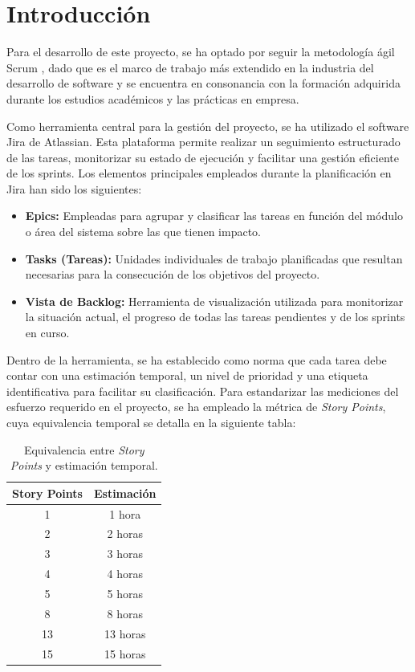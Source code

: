 
\section{Introducción}
Para el desarrollo de este proyecto, se ha optado por seguir la metodología ágil Scrum \cite{schwaber2020scrumguide}, dado que es el marco de trabajo más extendido en la industria del desarrollo de software y se encuentra en consonancia con la formación adquirida durante los estudios académicos y las prácticas en empresa.

Como herramienta central para la gestión del proyecto, se ha utilizado el software Jira de Atlassian. Esta plataforma permite realizar un seguimiento estructurado de las tareas, monitorizar su estado de ejecución y facilitar una gestión eficiente de los sprints. Los elementos principales empleados durante la planificación en Jira han sido los siguientes:
\begin{itemize}
    \item \textbf{Epics:} Empleadas para agrupar y clasificar las tareas en función del módulo o área del sistema sobre las que tienen impacto.
    \item \textbf{Tasks (Tareas):} Unidades individuales de trabajo planificadas que resultan necesarias para la consecución de los objetivos del proyecto.
    \item \textbf{Vista de Backlog:} Herramienta de visualización utilizada para monitorizar la situación actual, el progreso de todas las tareas pendientes y de los sprints en curso.
\end{itemize}

Dentro de la herramienta, se ha establecido como norma que cada tarea debe contar con una estimación temporal, un nivel de prioridad y una etiqueta identificativa para facilitar su clasificación. Para estandarizar las mediciones del esfuerzo requerido en el proyecto, se ha empleado la métrica de \textit{Story Points}, cuya equivalencia temporal se detalla en la siguiente tabla:

\begin{table}[H]
    \centering
    \begin{tabular}{| c | c |}
        \hline
        \textbf{Story Points} & \textbf{Estimación} \\ \hline
        1 & 1 hora \\ \hline
        2 & 2 horas \\ \hline
        3 & 3 horas \\ \hline
        4 & 4 horas \\ \hline
        5 & 5 horas \\ \hline
        8 & 8 horas \\ \hline
        13 & 13 horas \\ \hline
        15 & 15 horas \\ \hline
    \end{tabular}
    \caption{Equivalencia entre \textit{Story Points} y estimación temporal.}
\end{table}

